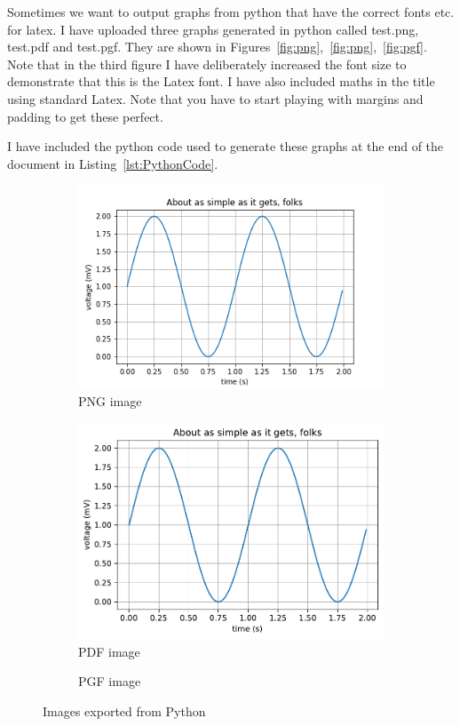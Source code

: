 \documentclass{article}
\begin{document}
Sometimes we want to output graphs from python that have the correct fonts etc. for latex. I have uploaded three graphs generated in python called \textsf{test.png}, \textsf{test.pdf} and \textsf{test.pgf}. They are shown in Figures~\ref{fig:png},~\ref{fig:png},~\ref{fig:pgf}. Note that in the third figure I have deliberately increased the font size to demonstrate that this is the Latex font. I have also included maths in the title using standard Latex. Note that you have to start playing with margins and padding to get these perfect.

I have included the python code used to generate these graphs at the end of the document in Listing~\ref{lst:PythonCode}.


\begin{figure}
	\centering
	\begin{subfigure}{0.4\textwidth}
		\includegraphics[width=\linewidth]{images/test.png}
        \caption{PNG image}
	\end{subfigure}
	\begin{subfigure}{0.4\textwidth}
		\includegraphics[width=\linewidth]{images/test.pdf}
        \caption{PDF image}
	\end{subfigure}
	\begin{subfigure}{0.4\textwidth}
		\resizebox{\textwidth}{!}{}
          \caption{PGF image}
	\end{subfigure}
\caption{Images exported from Python}
\end{figure}
\end{document}
